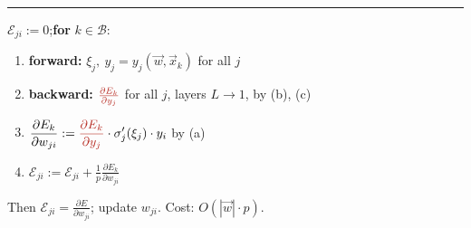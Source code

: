 \documentclass[10pt]{article}
\newcommand{\pd}[2]{\frac{\partial #1}{\partial #2}}
\newcommand{\Ey}[1]{\textcolor{BrickRed}{\pd{E_k}{y_{#1}}}}
\newcommand{\hsec}[1]{\par\vspace{4pt}{\large\bfseries #1}\par\vspace{1pt}\hrule\vspace{3pt}}
\begin{document}
\hsec{5\quad Algorithm (one step)}
\begin{minipage}[t]{0.55\textwidth}
$\mathcal E_{ji}:=0$;\quad \textbf{for} $k\in\mathcal B$:
\begin{enumerate}\setlength{\itemsep}{1pt}\setlength{\topsep}{2pt}
  \item \textbf{forward:} $\xi_j,\ y_j=y_j(\vec w,\vec x_k)$ for all $j$
  \item \textbf{backward:} $\Ey{j}$ for all $j$, layers $L\to1$, by (b), (c)
  \item $\displaystyle \pd{E_k}{w_{ji}}:=\Ey{j}\cdot\sigma_j'(\xi_j)\cdot y_i$ by (a)
  \item $\mathcal E_{ji}:=\mathcal E_{ji}+\frac1p\pd{E_k}{w_{ji}}$
\end{enumerate}
Then $\mathcal E_{ji}=\pd{E}{w_{ji}}$; update $w_{ji}$. Cost: $O(|\vec w|\cdot p)$.
\end{minipage}\hfill
\end{document}
